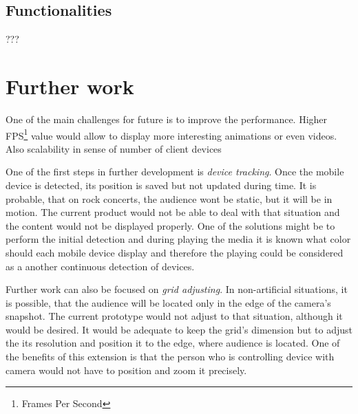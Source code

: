 \subsection{Functionalities}
???
\section{Further work}

One of the main challenges for future is to improve the performance.
Higher FPS\footnote{Frames Per Second} value would allow to display more interesting animations or even videos.
Also scalability in sense of number of client devices

One of the first steps in further development is \emph{device tracking}.
Once the mobile device is detected, its position is saved but not updated during time.
It is probable, that on rock concerts, the audience wont be static, but it will be in motion.
The current product would not be able to deal with that situation and the content would not be displayed properly.
One of the solutions might be to perform the initial detection and during playing the media it is known what color should each mobile device display and therefore the playing could be considered as a another continuous detection of devices.

Further work can also be focused on \emph{grid adjusting}.
In non-artificial situations, it is possible, that the audience will be located only in the edge of the camera's snapshot.
The current prototype would not adjust to that situation, although it would be desired.
It would be adequate to keep the grid's dimension but to adjust the its resolution and position it to the edge, where audience is located.
One of the benefits of this extension is that the person who is controlling device with camera would not have to position and zoom it precisely.

